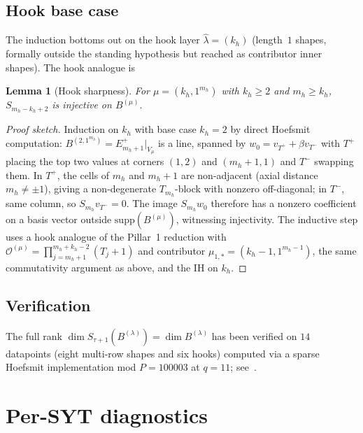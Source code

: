 \documentclass[11pt]{article}
\newtheorem{lemma}[theorem]{Lemma}
\theoremstyle{definition}
\newcommand{\bla}{\widehat\lambda}
\newcommand{\Eplus}{E^{+}}
\newcommand{\supp}{\mathrm{supp}}
\newcommand{\Outer}{\mathcal{O}}
\begin{document}
\subsection{Hook base case}\label{sec:hook-base}

The induction bottoms out on the hook layer $\bla = (k_h)$ (length~$1$
shapes, formally outside the standing hypothesis but reached as
contributor inner shapes).  The hook analogue is

\begin{lemma}[Hook sharpness]\label{lem:hook-sharp-survey}
For $\mu = (k_h, 1^{m_h})$ with $k_h \ge 2$ and $m_h \ge k_h$, $S_{m_h - k_h + 2}$
is injective on $B^{(\mu)}$.
\end{lemma}

\begin{proof}[Proof sketch]
Induction on $k_h$ with base case $k_h = 2$ by direct Hoefsmit
computation: $B^{(2, 1^{m_h})} = \Eplus_{m_h+1}|_{V_\mu}$ is a line, spanned
by $w_0 = v_{T^+} + \beta v_{T^-}$ with $T^+$ placing the top two values
at corners $(1,2)$ and $(m_h+1, 1)$ and $T^-$ swapping them.  In $T^+$,
the cells of $m_h$ and $m_h+1$ are non-adjacent (axial distance $m_h \ne \pm 1$),
giving a non-degenerate $T_{m_h}$-block with nonzero off-diagonal; in
$T^-$, same column, so $S_{m_h} v_{T^-} = 0$.  The image $S_{m_h} w_0$
therefore has a nonzero coefficient on a basis vector outside
$\supp(B^{(\mu)})$, witnessing injectivity.  The inductive step uses a
hook analogue of the Pillar~1 reduction with $\Outer^{(\mu)} = \prod_{j=m_h+1}^{m_h+k_h-2}(T_j+1)$
and contributor $\mu_{1,*} = (k_h-1, 1^{m_h-1})$, the same commutativity
argument as above, and the IH on $k_h$.
\end{proof}

\subsection{Verification}\label{sec:sharp-verify}

The full rank $\dim S_{\tau+1}(B^{(\lambda)}) = \dim B^{(\lambda)}$ has been
verified on $14$ datapoints (eight multi-row shapes and six hooks)
computed via a sparse Hoefsmit implementation mod $P = 100003$ at
$q = 11$; see~\cite[Table~1]{sharpnessTauPlus1}.

\section{Per-SYT diagnostics}\label{sec:per-syt-diagnostics}
\end{document}
